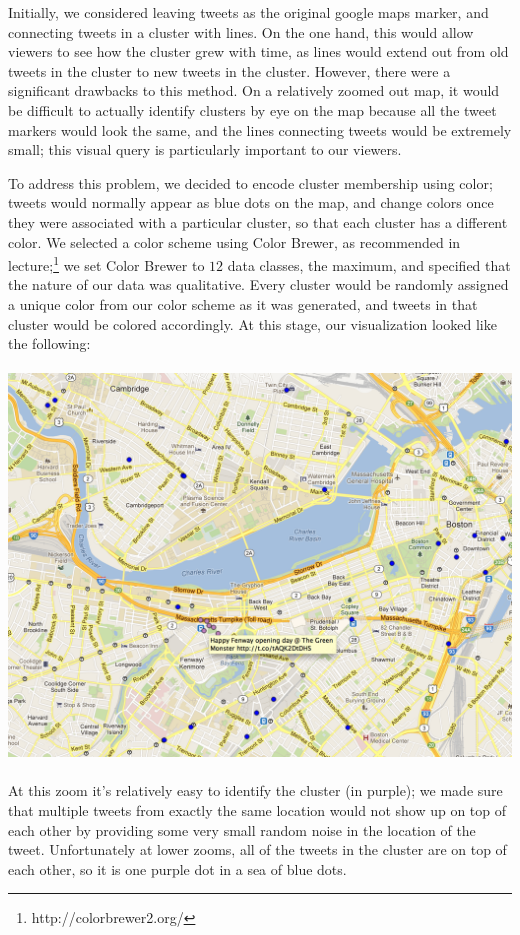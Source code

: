 \documentclass[pdftex,12pt,a4paper]{article}
\begin{document}
Initially, we considered leaving tweets as the original google maps marker, and connecting tweets in a cluster with lines. On the one hand, this would allow viewers to see how the cluster grew with time, as lines would extend out from old tweets in the cluster to new tweets in the cluster. However, there were a significant drawbacks to this method. On a relatively zoomed out map, it would be difficult to actually identify clusters by eye on the map because all the tweet markers would look the same, and the lines connecting tweets would be extremely small; this visual query is particularly important to our viewers.

To address this problem, we decided to encode cluster membership using color; tweets would normally appear as blue dots on the map, and change colors once they were associated with a particular cluster, so that each cluster has a different color. We selected a color scheme using Color Brewer, as recommended in lecture;\footnote{http://colorbrewer2.org/} we set Color Brewer to $12$ data classes, the maximum, and specified that the nature of our data was qualitative. Every cluster would be randomly assigned a unique color from our color scheme as it was generated, and tweets in that cluster would be colored accordingly. At this stage, our visualization looked like the following: \\ \\
\includegraphics[width=5.5in]{fail1.png} \\ \\
At this zoom it's relatively easy to identify the cluster (in purple); we made sure that multiple tweets from exactly the same location would not show up on top of each other by providing some very small random noise in the location of the tweet. Unfortunately at lower zooms, all of the tweets in the cluster are on top of each other, so it is one purple dot in a sea of blue dots.
\end{document}
